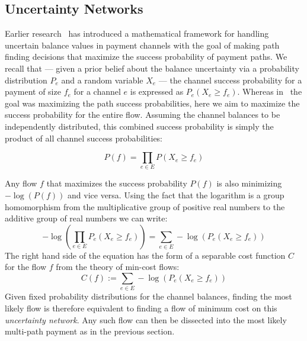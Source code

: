 \documentclass[10pt,twocolumn]{article}
\begin{document}
\subsection{Uncertainty Networks}
Earlier research~\cite{pickhardt2021security} has introduced a mathematical framework for handling uncertain balance values in payment channels with the goal of making path finding decisions that maximize the success probability of payment paths.
We recall that --- given a prior belief about the balance uncertainty via a probability distribution $P_e$ and a random variable $X_e$ ---  the channel success probability for a payment of size $f_e$ for a channel $e$ is expressed as $P_e(X_e\geq f_e)$.
Whereas in~\cite{pickhardt2021security} the goal was maximizing the path success probabilities, here we aim to maximize the success probability for the entire flow. Assuming the channel balances to be independently distributed, this combined success probability is simply the product of all channel success probabilities:

\[
P(f)=\prod_{e\in E}P(X_{e} \geq f_e)
\]

Any flow $f$ that maximizes the success probability $P(f)$ is also minimizing $-\log\left(P(f)\right)$ and vice versa.
Using the fact that the logarithm is a group homomorphism from the multiplicative group of positive real numbers to the additive group of real numbers we can write:
\[
-\log\left(\prod_{e\in E}P_e(X_{e} \geq f_e)\right) = \sum_{e\in E}-\log\left(P_e(X_e \geq f_e)\right)
\]
The right hand side of the equation has the form of a separable cost function $C$ for the flow $f$ from the theory of min-cost flows:
\[
C(f) := \sum_{e\in E}-\log\left(P_e(X_e \geq f_e)\right)
\]
Given fixed probability distributions for the channel balances, finding the most likely flow is therefore equivalent to finding a flow of minimum cost on this \emph{uncertainty network}. Any such flow can then be dissected into the most likely multi-path payment as in the previous section.
\end{document}
